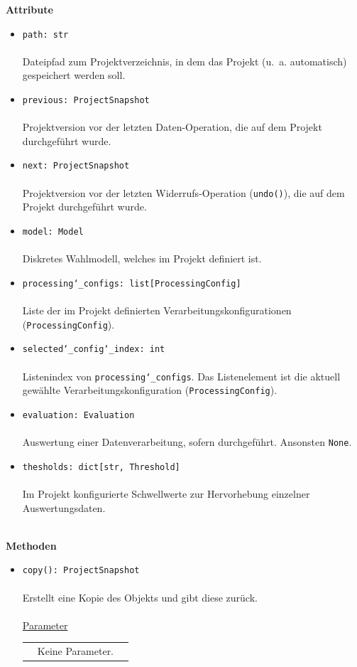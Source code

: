 \documentclass{article}
\begin{document}
\begin{itemize}
\textbf{Attribute}
\begin{itemize}\setlength\itemsep{3em}
\item \texttt{path: str}\\\\
Dateipfad zum Projektverzeichnis, in dem das Projekt (u.~a. automatisch) gespeichert werden soll.
\item \texttt{previous: ProjectSnapshot}\\\\
Projektversion vor der letzten Daten-Operation, die auf dem Projekt durchgeführt wurde.
\item \texttt{next: ProjectSnapshot}\\\\
Projektversion vor der letzten Widerrufs-Operation (\texttt{undo()}), die auf dem Projekt durchgeführt wurde.
\item \texttt{model: Model}\\\\
Diskretes Wahlmodell, welches im Projekt definiert ist.
\item \texttt{processing\char`_configs: list[ProcessingConfig]}\\\\
Liste der im Projekt definierten Verarbeitungskonfigurationen (\texttt{ProcessingConfig}).
\item \texttt{selected\char`_config\char`_index: int}\\\\
Listenindex von \texttt{processing\char`_configs}. Das Listenelement ist die aktuell gewählte Verarbeitungskonfiguration (\texttt{ProcessingConfig}).
\item \texttt{evaluation: Evaluation}\\\\
Auswertung einer Datenverarbeitung, sofern durchgeführt. Ansonsten \texttt{None}.
\item \texttt{thesholds: dict[str, Threshold]}\\\\
Im Projekt konfigurierte Schwellwerte zur Hervorhebung einzelner Auswertungsdaten.
\\\\
\end{itemize}

\textbf{Methoden}
\begin{itemize}\setlength\itemsep{3em}
\item \texttt{copy(): ProjectSnapshot}\\\\
Erstellt eine Kopie des Objekts und gibt diese zurück.
\\\\
\underline{Parameter}\\
\begin{tabular}{lll}
 & Keine Parameter.
\end{tabular}


\end{itemize}
\end{itemize}
\end{document}
